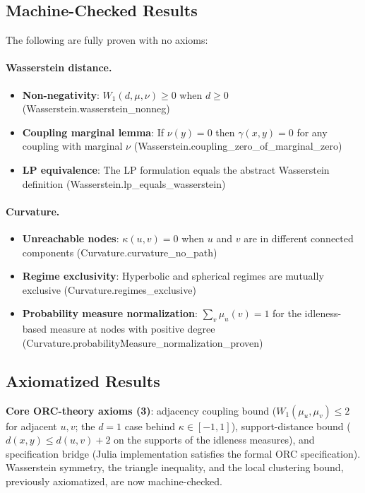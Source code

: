 \documentclass[12pt]{article}
\newcommand{\Wone}{W_1}
\newcommand{\lean}[1]{{\ttfamily\hyphenchar\font=45\relax #1}}
\begin{document}
\subsection{Machine-Checked Results}

The following are fully proven with no axioms:

\paragraph{Wasserstein distance.}
\begin{itemize}
  \item \textbf{Non-negativity}: $\Wone(d,\mu,\nu) \geq 0$ when $d \geq 0$
  (\lean{Wasserstein.wasserstein\_nonneg})
  \item \textbf{Coupling marginal lemma}: If $\nu(y) = 0$ then $\gamma(x,y) = 0$ for any
  coupling with marginal $\nu$
  (\lean{Wasserstein.\-coupling\_\-zero\_\-of\_\-marginal\_\-zero})
  \item \textbf{LP equivalence}: The LP formulation equals the abstract Wasserstein
  definition (\lean{Wasserstein.lp\_equals\_wasserstein})
\end{itemize}

\paragraph{Curvature.}
\begin{itemize}
  \item \textbf{Unreachable nodes}: $\kappa(u,v) = 0$ when $u$ and $v$ are in different
  connected components (\lean{Curvature.curvature\_no\_path})
  \item \textbf{Regime exclusivity}: Hyperbolic and spherical regimes are mutually exclusive
  (\lean{Curvature.regimes\_exclusive})
  \item \textbf{Probability measure normalization}: $\sum_v \mu_u(v) = 1$ for the
  idleness-based measure at nodes with positive degree
  (\lean{Curvature.\-probability\-Measure\_\-normalization\_\-proven})
\end{itemize}

\subsection{Axiomatized Results}

\textbf{Core ORC-theory axioms (3)}: adjacency coupling bound
($\Wone(\mu_u,\mu_v) \leq 2$ for adjacent $u,v$; the $d=1$ case behind
$\kappa \in [-1,1]$), support-distance bound ($d(x,y) \leq d(u,v) + 2$ on the supports of
the idleness measures), and specification bridge (Julia implementation satisfies the formal
ORC specification). Wasserstein symmetry, the triangle inequality, and the local clustering
bound, previously axiomatized, are now machine-checked.
\end{document}
